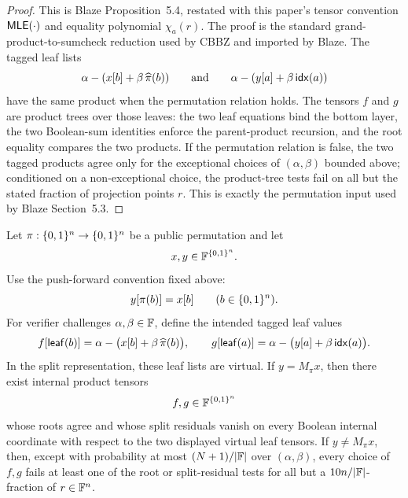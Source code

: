 \begin{proof}
This is Blaze Proposition~5.4, restated with this paper's tensor convention
\(\mathsf{MLE}(\cdot)\) and equality polynomial \(\chi_a(r)\).  The proof is the
standard grand-product-to-sumcheck reduction used by CBBZ and imported by
Blaze.  The tagged leaf lists
\[
  \alpha-(x[b]+\beta\,\widehat\pi(b))
  \qquad\text{and}\qquad
  \alpha-(y[a]+\beta\,\mathsf{idx}(a))
\]
have the same product when the permutation relation holds.  The tensors
\(f\) and \(g\) are product trees over those leaves: the two leaf equations bind
the bottom layer, the two Boolean-sum identities enforce the parent-product
recursion, and the root equality compares the two products.  If the
permutation relation is false, the two tagged products agree only for the
exceptional choices of \((\alpha,\beta)\) bounded above; conditioned on a
non-exceptional choice, the product-tree tests fail on all but the stated
fraction of projection points \(r\).  This is exactly the permutation input
used by Blaze Section~5.3.
\end{proof}

\begin{proposition}
\label{prop:native-permutation-reduction}
Let \(\pi:\{0,1\}^n\to\{0,1\}^n\) be a public permutation and let
\[
  x,y\in\mathbb{F}^{\{0,1\}^n}.
\]
Use the push-forward convention fixed above:
\[
  y[\pi(b)]=x[b]\qquad(b\in\{0,1\}^n).
\]
For verifier challenges \(\alpha,\beta\in\mathbb{F}\), define the intended tagged
leaf values
\[
  f[\mathsf{leaf}(b)]
  =
  \alpha-\bigl(x[b]+\beta\,\widehat\pi(b)\bigr),
  \qquad
  g[\mathsf{leaf}(a)]
  =
  \alpha-\bigl(y[a]+\beta\,\mathsf{idx}(a)\bigr).
\]
In the split representation, these leaf lists are virtual.  If \(y=M_\pi x\),
then there exist internal product tensors
\[
  f,g\in\mathbb{F}^{\{0,1\}^n}
\]
whose roots agree and whose split residuals vanish on every Boolean internal
coordinate with respect to the two displayed virtual leaf tensors.  If
\(y\ne M_\pi x\), then, except with probability at most \((N+1)/|\mathbb{F}|\) over
\((\alpha,\beta)\), every choice of \(f,g\) fails at least one of the root
or split-residual tests for all but a \(10n/|\mathbb{F}|\)-fraction of
\(r\in\mathbb{F}^n\).
\end{proposition}

